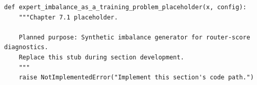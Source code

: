 \begin{lstlisting}[style=bookpython,caption={Planned code placeholder for expert imbalance as a training problem.},label={lst:ch07-expert-imbalance-as-a-training-problem}]
def expert_imbalance_as_a_training_problem_placeholder(x, config):
    """Chapter 7.1 placeholder.

    Planned purpose: Synthetic imbalance generator for router-score diagnostics.
    Replace this stub during section development.
    """
    raise NotImplementedError("Implement this section's code path.")
\end{lstlisting}
